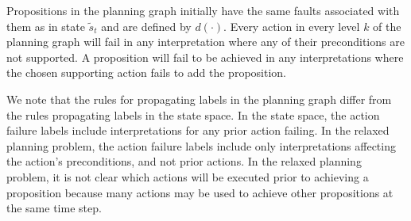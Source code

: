 \documentclass{article}
\begin{document}
\noindent Propositions in the planning graph initially have the same faults associated with them as in state $\tilde{s}_t$ and are defined by $d(\cdot)$.  Every action in every level $k$ of the planning graph will fail in any interpretation where any of their preconditions are not supported.  A proposition will fail to be achieved in any interpretations where the chosen supporting action fails to add the proposition.

We note that the rules for propagating labels in the planning graph differ from the rules propagating labels in the state space.  In the state space, the action failure labels include interpretations for any prior action failing.  In the relaxed planning problem, the action failure labels include only interpretations affecting the action's preconditions, and not prior actions.  In the relaxed planning problem, it is not clear which actions will be executed prior to achieving a proposition because many actions may be used to achieve other propositions at the same time step.  
\end{document}
